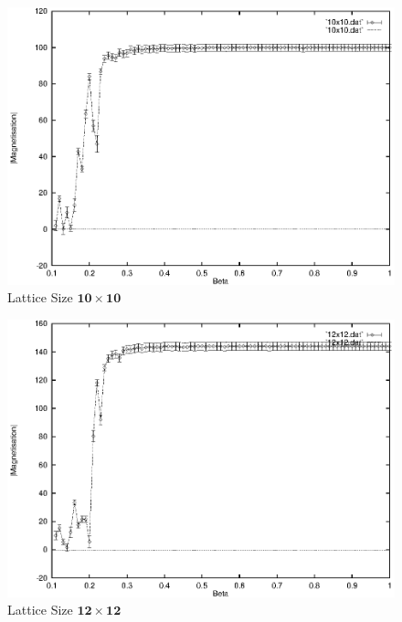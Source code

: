 \documentclass[a4paper]{IEEEtran}
\begin{document}
    \begin{figure} 
    \caption{Lattice Size $\mathbf{10 \times 10}$}
    \label{fig:10x10-2} 
    \begin{center}
        \includegraphics[width=0.99\columnwidth]{10x10_2.eps}
    \end{center}
    \end{figure} 

    \begin{figure}
    \caption{Lattice Size $\mathbf{12 \times 12}$}
    \label{fig:12x12-2} 
    \begin{center}
        \includegraphics[width=0.99\columnwidth]{12x12_2.eps}
    \end{center}
    \end{figure} 
\end{document}
